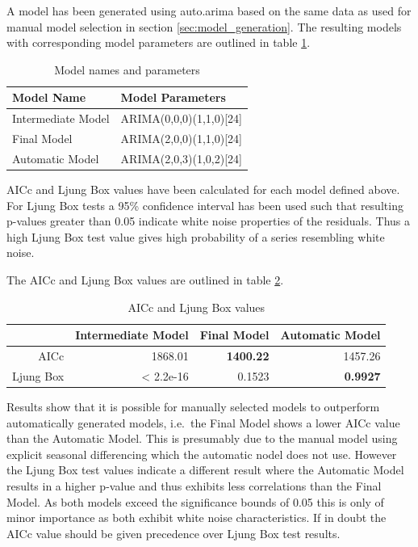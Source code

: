 A model has been generated using auto.arima based on the same data as used for manual model selection in section \ref{sec:model_generation}. 
The resulting models with corresponding model parameters are outlined in table \ref{tab:model_names_and_parameters}. 

\begin{table}[ht]
\centering
\begin{tabular}{l|l}
 Model Name & Model Parameters \\ 
  \hline
	Intermediate Model	& ARIMA(0,0,0)(1,1,0)[24] \\ 
	Final Model 				& ARIMA(2,0,0)(1,1,0)[24] \\ 
	Automatic Model 		& ARIMA(2,0,3)(1,0,2)[24] \\ 
\end{tabular}
\caption{Model names and parameters}
\label{tab:model_names_and_parameters}
\end{table}

AICc and Ljung Box values have been calculated for each model defined above. For Ljung Box tests a 95\% confidence interval has been used
such that resulting p-values greater than 0.05 indicate white noise properties of the residuals. Thus a high Ljung Box test value gives 
high probability of a series resembling white noise. 

The AICc and Ljung Box values are outlined in table \ref{tab:model_aicc_and_ljung_box_values}. 

\begin{table}[ht]
\centering
\begin{tabular}{r|r|r|r}
 & Intermediate Model & Final Model & Automatic Model \\ 
  \hline
	AICc 			& 1868.01 & \textbf{1400.22} & 1457.26 \\ 
  Ljung Box & < 2.2e-16 & 0.1523 & \textbf{0.9927} \\ 
\end{tabular}
\caption{AICc and Ljung Box values}
\label{tab:model_aicc_and_ljung_box_values}
\end{table}

Results show that it is possible for manually selected models to outperform automatically generated models, i.e.~the Final Model shows a lower AICc value than the Automatic Model. This is presumably due to the manual model using explicit seasonal differencing which the automatic nodel does not use. However the Ljung Box test values indicate a different result where the Automatic Model results in a higher p-value and thus exhibits less correlations than the Final Model. As both models exceed the significance bounds of 0.05 this is only of minor importance as both exhibit white noise characteristics. If in doubt the AICc value should be given precedence over Ljung Box test results. 

